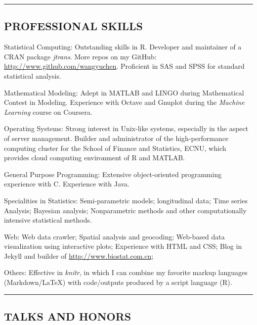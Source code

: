 \documentclass[10pt]{article}
\newcommand{\CPP}
{C\nolinebreak[4]\hspace{-.05em}\raisebox{.22ex}{\footnotesize\bf ++}}
\begin{document}
	
\hrule
\vspace{-0.4em}
\subsection*{\centering PROFESSIONAL SKILLS}

\begin{description*}
	\item[Statistical Computing:] Outstanding skills in R. Developer and maintainer of a CRAN package \emph{jtrans}. More repos on my GitHub: \url{http://www.github.com/wangyuchen}. Proficient in SAS and SPSS for standard statistical analysis.
	\item[Mathematical Modeling:] Adept in MATLAB and LINGO during Mathematical Contest in Modeling. Experience with Octave and Gnuplot during the \emph{Machine Learning} course on Coursera.
	\item[Operating Systems:] Strong interest in Unix-like systems, especially in the aspect of server management. Builder and administrator of the high-performance computing cluster for the School of Finance and Statistics, ECNU, which provides cloud computing environment of R and MATLAB.
	\item[General Purpose Programming:] Extensive object-oriented programming experience with \CPP. Experience with Java.
	\item[Specialities in Statistics:] Semi-parametric models; longitudinal data; Time series Analysis; Bayesian analysis; Nonparametric methods and other computationally intensive statistical methods.
	\item[Web:] Web data crawler; Spatial analysis and geocoding; Web-based data visualization using interactive plots; Experience with HTML and CSS; Blog in Jekyll and builder of \url{http://www.biostat.com.cn}; 
	\item[Others:] Effective in \emph{knitr}, in which I can combine my favorite markup languages (Markdown/\LaTeX) with code/outputs produced by a script language (R).
\end{description*}

\hrule
\vspace{-0.4em}
\subsection*{\centering TALKS AND HONORS}
\end{document}

